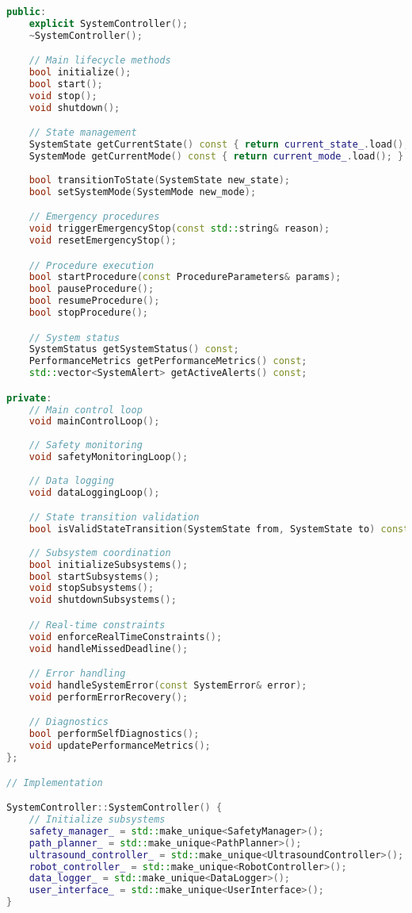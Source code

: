 \begin{lstlisting}[language=C++, caption={Main System Controller Implementation}, label={lst:app-main-controller}]
public:
    explicit SystemController();
    ~SystemController();

    // Main lifecycle methods
    bool initialize();
    bool start();
    void stop();
    void shutdown();

    // State management
    SystemState getCurrentState() const { return current_state_.load(); }
    SystemMode getCurrentMode() const { return current_mode_.load(); }
    
    bool transitionToState(SystemState new_state);
    bool setSystemMode(SystemMode new_mode);

    // Emergency procedures
    void triggerEmergencyStop(const std::string& reason);
    void resetEmergencyStop();

    // Procedure execution
    bool startProcedure(const ProcedureParameters& params);
    bool pauseProcedure();
    bool resumeProcedure();
    bool stopProcedure();

    // System status
    SystemStatus getSystemStatus() const;
    PerformanceMetrics getPerformanceMetrics() const;
    std::vector<SystemAlert> getActiveAlerts() const;

private:
    // Main control loop
    void mainControlLoop();
    
    // Safety monitoring
    void safetyMonitoringLoop();
    
    // Data logging
    void dataLoggingLoop();

    // State transition validation
    bool isValidStateTransition(SystemState from, SystemState to) const;
    
    // Subsystem coordination
    bool initializeSubsystems();
    bool startSubsystems();
    void stopSubsystems();
    void shutdownSubsystems();

    // Real-time constraints
    void enforceRealTimeConstraints();
    void handleMissedDeadline();

    // Error handling
    void handleSystemError(const SystemError& error);
    void performErrorRecovery();

    // Diagnostics
    bool performSelfDiagnostics();
    void updatePerformanceMetrics();
};

// Implementation

SystemController::SystemController() {
    // Initialize subsystems
    safety_manager_ = std::make_unique<SafetyManager>();
    path_planner_ = std::make_unique<PathPlanner>();
    ultrasound_controller_ = std::make_unique<UltrasoundController>();
    robot_controller_ = std::make_unique<RobotController>();
    data_logger_ = std::make_unique<DataLogger>();
    user_interface_ = std::make_unique<UserInterface>();
}


\end{lstlisting}
